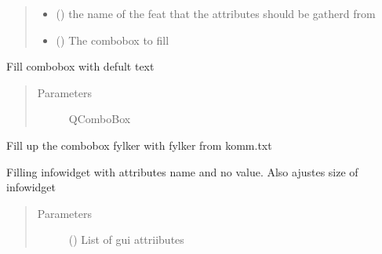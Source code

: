 \documentclass[letterpaper,10pt,english]{sphinxmanual}
\begin{document}
\begin{fulllineitems}
\begin{fulllineitems}
\begin{quote}
\begin{description}
\begin{itemize}
\item {} 
 () \textendash{} the name of the feat that the attributes should be gatherd from

\item {} 
 () \textendash{} The combobox to fill

\end{itemize}

\end{description}\end{quote}

\end{fulllineitems}


\begin{fulllineitems}
\label{\detokenize{code:Tilgjengelighet.Tilgjengelighet.fill_combobox_mer_mindre}}
Fill combobox with defult text
\begin{quote}\begin{description}
\item[{Parameters}] \leavevmode
{} \textendash{} QComboBox

\end{description}\end{quote}

\end{fulllineitems}


\begin{fulllineitems}
\label{\detokenize{code:Tilgjengelighet.Tilgjengelighet.fill_fylker}}
Fill up the combobox fylker with fylker from komm.txt

\end{fulllineitems}


\begin{fulllineitems}
\label{\detokenize{code:Tilgjengelighet.Tilgjengelighet.fill_infoWidget}}
Filling infowidget with attributes name and no value. Also ajustes size of infowidget
\begin{quote}\begin{description}
\item[{Parameters}] \leavevmode
{} () \textendash{} List of gui attriibutes


\end{description}
\end{quote}
\end{fulllineitems}
\end{fulllineitems}
\end{document}
